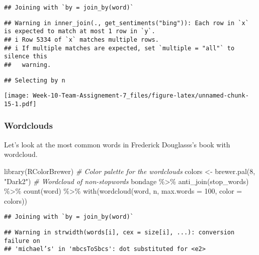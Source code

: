 \documentclass[
]{article}
\newenvironment{Shaded}{\begin{snugshade}}{\end{snugshade}}
\newcommand{\AttributeTok}[1]{\textcolor[rgb]{0.77,0.63,0.00}{#1}}
\newcommand{\CommentTok}[1]{\textcolor[rgb]{0.56,0.35,0.01}{\textit{#1}}}
\newcommand{\DecValTok}[1]{\textcolor[rgb]{0.00,0.00,0.81}{#1}}
\newcommand{\FunctionTok}[1]{\textcolor[rgb]{0.00,0.00,0.00}{#1}}
\newcommand{\NormalTok}[1]{#1}
\newcommand{\OtherTok}[1]{\textcolor[rgb]{0.56,0.35,0.01}{#1}}
\newcommand{\SpecialCharTok}[1]{\textcolor[rgb]{0.00,0.00,0.00}{#1}}
\newcommand{\StringTok}[1]{\textcolor[rgb]{0.31,0.60,0.02}{#1}}
\begin{document}
\begin{verbatim}
## Joining with `by = join_by(word)`
\end{verbatim}

\begin{verbatim}
## Warning in inner_join(., get_sentiments("bing")): Each row in `x` is expected to match at most 1 row in `y`.
## i Row 5334 of `x` matches multiple rows.
## i If multiple matches are expected, set `multiple = "all"` to silence this
##   warning.
\end{verbatim}

\begin{verbatim}
## Selecting by n
\end{verbatim}

\texttt{[image: Week-10-Team-Assignement-7\_files/figure-latex/unnamed-chunk-15-1.pdf]}

\hypertarget{wordclouds}{%
\subsubsection{Wordclouds}\label{wordclouds}}

Let's look at the most common words in Frederick Douglasss's book with
wordcloud.

\begin{Shaded}
\begin{Highlighting}[]
\FunctionTok{library}\NormalTok{(RColorBrewer)}
\CommentTok{\# Color palette for the wordclouds}
\NormalTok{colors }\OtherTok{\textless{}{-}} \FunctionTok{brewer.pal}\NormalTok{(}\DecValTok{8}\NormalTok{, }\StringTok{"Dark2"}\NormalTok{)}
\CommentTok{\# Wordcloud of non{-}stopwords}
\NormalTok{bondage }\SpecialCharTok{\%\textgreater{}\%}
  \FunctionTok{anti\_join}\NormalTok{(stop\_words) }\SpecialCharTok{\%\textgreater{}\%}
  \FunctionTok{count}\NormalTok{(word) }\SpecialCharTok{\%\textgreater{}\%}
  \FunctionTok{with}\NormalTok{(}\FunctionTok{wordcloud}\NormalTok{(word, n, }\AttributeTok{max.words =} \DecValTok{100}\NormalTok{, }\AttributeTok{color =}\NormalTok{ colors))}
\end{Highlighting}
\end{Shaded}

\begin{verbatim}
## Joining with `by = join_by(word)`
\end{verbatim}

\begin{verbatim}
## Warning in strwidth(words[i], cex = size[i], ...): conversion failure on
## 'michael’s' in 'mbcsToSbcs': dot substituted for <e2>
\end{verbatim}
\end{document}
